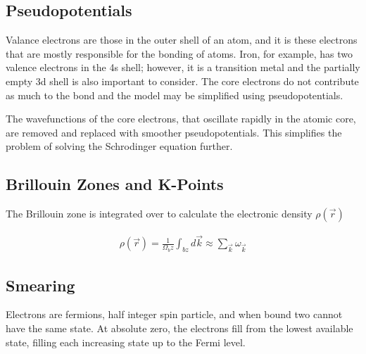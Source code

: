 \subsection{Pseudopotentials}

Valance electrons are those in the outer shell of an atom, and it is these electrons that are mostly responsible for the bonding of atoms.  Iron, for example, has two valence electrons in the 4s shell; however, it is a transition metal and the partially empty 3d shell is also important to consider.  The core electrons do not contribute as much to the bond and the model may be simplified using pseudopotentials.

The wavefunctions of the core electrons, that oscillate rapidly in the atomic core, are removed and replaced with smoother pseudopotentials.  This simplifies the problem of solving the Schrodinger equation further.













\subsection{Brillouin Zones and K-Points}



The Brillouin zone is integrated over to calculate the electronic density $\rho(\vec{r})$


\begin{equation}
\begin{split}
\rho(\vec{r}) = \frac{1}{\Omega_bz} \int_{bz} d\vec{k} \approx \sum_{\vec{k}} \omega_{\vec{k}}
\end{split}
\label{eq:Fermi-Dirac distribution}
\end{equation}







\subsection{Smearing}

Electrons are fermions, half integer spin particle, and when bound two cannot have the same state.  At absolute zero, the electrons fill from the lowest available state, filling each increasing state up to the Fermi level.  

